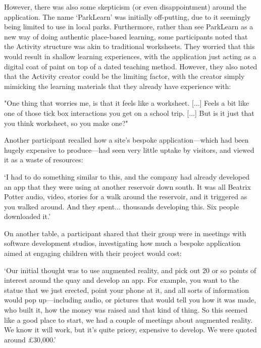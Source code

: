 However, there was also some skepticism (or even disappointment) around the application. The name `ParkLearn' was initially off-putting, due to it seemingly being limited to use in local parks. Furthermore, rather than see ParkLearn as a new way of doing authentic place-based learning, some participants noted that the Activity structure was akin to traditional worksheets. They worried that this would result in shallow learning experiences, with the application just acting as a digital coat of paint on top of a dated teaching method. However, they also noted that the Activity creator could be the limiting factor, with the creator simply mimicking the learning materials that they already have experience with:

\begin{displayquote}
"One thing that worries me, is that it feels like a worksheet. [...] Feels a bit like one of those tick box interactions you get on a school trip. [...] But is it just that you think worksheet, so you make one?"
\end{displayquote}

Another participant recalled how a site's bespoke application---which had been hugely expensive to produce---had seen very little uptake by visitors, and viewed it as a waste of resources:

\begin{displayquote}
`I had to do something similar to this, and the company had already developed an app that they were using at another reservoir down south. It was all Beatrix Potter audio, video, stories for a walk around the reservoir, and it triggered as you walked around. And they spent... thousands developing this. Six people downloaded it.'
\end{displayquote}

On another table, a participant shared that their group were in meetings with software development studios, investigating how much a bespoke application aimed at engaging children with their project would cost:

\begin{displayquote}
`Our initial thought was to use augmented reality, and pick out 20 or so points of interest around the quay and develop an app. For example, you want to the statue that we just erected, point your phone at it, and all sorts of information would pop up---including audio, or pictures that would tell you how it was made, who built it, how the money was raised and that kind of thing. So this seemed like a good place to start, we had a couple of meetings about augmented reality. We know it will work, but it's quite pricey, expensive to develop. We were quoted around £30,000.'
\end{displayquote}

